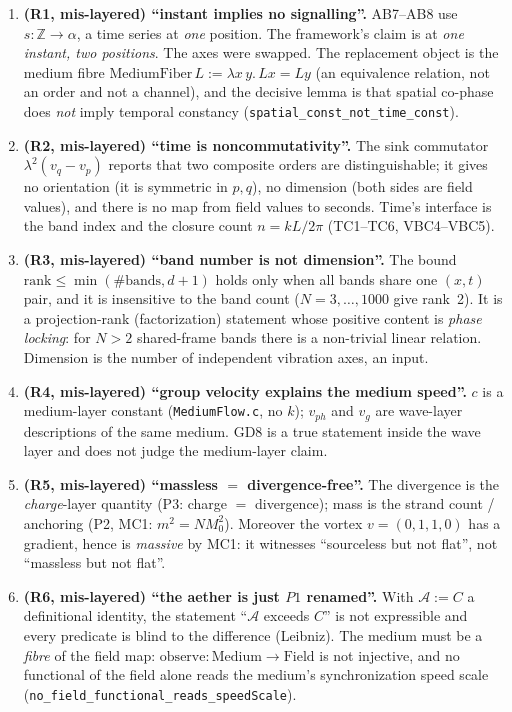 \documentclass[aps,prd,preprint,superscriptaddress,amsmath,amssymb]{revtex4-2}
\begin{document}
\begin{enumerate}
\item \textbf{(R1, mis-layered) ``instant implies no signalling''.}
AB7--AB8 use $s:\mathbb{Z}\to\alpha$, a time series at \emph{one} position.
The framework's claim is at \emph{one instant, two positions}.  The axes were
swapped.  The replacement object is the medium fibre
$\mathrm{MediumFiber}\,L := \lambda x\,y.\, L x = L y$ (an equivalence
relation, not an order and not a channel), and the decisive lemma is that
spatial co-phase does \emph{not} imply temporal constancy
(\texttt{spatial\_const\_not\_time\_const}).
\item \textbf{(R2, mis-layered) ``time is noncommutativity''.}
The sink commutator $\lambda^{2}(v_q-v_p)$ reports that two composite orders
are distinguishable; it gives no orientation (it is symmetric in $p,q$), no
dimension (both sides are field values), and there is no map from field values
to seconds.  Time's interface is the band index and the closure count
$n=kL/2\pi$ (TC1--TC6, VBC4--VBC5).
\item \textbf{(R3, mis-layered) ``band number is not dimension''.}
The bound $\mathrm{rank}\le\min(\#\text{bands},d+1)$ holds only when all bands
share one $(x,t)$ pair, and it is insensitive to the band count
($N=3,\dots,1000$ give rank~2).  It is a projection-rank (factorization)
statement whose positive content is \emph{phase locking}: for $N>2$ shared-frame
bands there is a non-trivial linear relation.  Dimension is the number of
independent vibration axes, an input.
\item \textbf{(R4, mis-layered) ``group velocity explains the medium speed''.}
$c$ is a medium-layer constant (\texttt{MediumFlow.c}, no $k$); $v_{ph}$ and
$v_g$ are wave-layer descriptions of the same medium.  GD8 is a true statement
inside the wave layer and does not judge the medium-layer claim.
\item \textbf{(R5, mis-layered) ``massless $=$ divergence-free''.}
The divergence is the \emph{charge}-layer quantity (P3: charge $=$ divergence);
mass is the strand count / anchoring (P2, MC1: $m^{2}=N M_0^{2}$).  Moreover the
vortex $v=(0,1,1,0)$ has a gradient, hence is \emph{massive} by MC1: it witnesses
``sourceless but not flat'', not ``massless but not flat''.
\item \textbf{(R6, mis-layered) ``the aether is just $P1$ renamed''.}
With $\mathcal{A}:=C$ a definitional identity, the statement ``$\mathcal{A}$
exceeds $C$'' is not expressible and every predicate is blind to the difference
(Leibniz).  The medium must be a \emph{fibre} of the field map:
$\mathrm{observe}:\text{Medium}\to\text{Field}$ is not injective, and no
functional of the field alone reads the medium's synchronization speed scale
(\texttt{no\_field\_functional\_reads\_speedScale}).
\end{enumerate}
\end{document}

